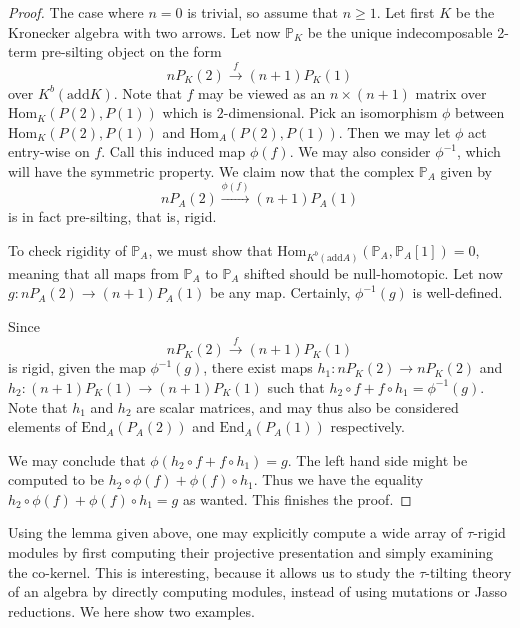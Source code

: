 \documentclass[]{article}
\theoremstyle{definition}
\newcommand{\tu}{\ensuremath{\tau}}
\begin{document}
\begin{proof}
	The case where $n = 0$ is trivial, so assume that $n \geq 1$. Let first $K$ be the Kronecker algebra with two arrows. Let now $\mathbb{P}_K $ be the unique indecomposable 2-term pre-silting object on the form \[nP_K(2) \xrightarrow{f} (n+1)P_K(1)\] over $K^b(\text{add} K)$. Note that $f$ may be viewed as an $n\times(n+1)$ matrix over $\text{Hom}_K(P(2),P(1))$ which is $2$-dimensional. Pick an isomorphism $\phi$ between $\text{Hom}_K(P(2),P(1))$ and $\text{Hom}_A(P(2),P(1))$. Then we may let $\phi$ act entry-wise on $f$. Call this induced map $\phi(f)$. We may also consider $\phi^{-1}$, which will have the symmetric property. We claim now that the complex $\mathbb{P}_A$ given by  \[nP_A(2) \xrightarrow{\phi(f)} (n+1)P_A(1)\] is in fact pre-silting, that is, rigid.
	
	To check rigidity of $\mathbb{P}_A$, we must show that $\text{Hom}_{K^b(\text{add} A)}(\mathbb{P}_A,\mathbb{P}_A[1]) = 0$, meaning that all maps from $\mathbb{P}_A$ to $\mathbb{P}_A$ shifted should be null-homotopic. Let now $g:nP_A(2) \to (n+1)P_A(1)$ be any map. Certainly, $\phi^{-1}(g)$ is well-defined.
	
	Since \[nP_K(2) \xrightarrow{f} (n+1)P_K(1)\] is rigid, given the map $\phi^{-1}(g)$, there exist maps $h_1:nP_K(2) \to nP_K(2)$ and $h_2:(n+1)P_K(1) \to (n+1)P_K(1)$ such that $h_2\circ f + f \circ h_1 = \phi^{-1}(g)$. Note that $h_1$ and $h_2$ are scalar matrices, and may thus also be considered elements of $\text{End}_A(P_A(2))$ and $\text{End}_A(P_A(1))$ respectively.
	
	We may conclude that $\phi(h_2\circ f + f \circ h_1) = g$. The left hand side might be computed to be $h_2 \circ \phi(f) + \phi(f) \circ h_1$. Thus we have the equality $h_2 \circ \phi(f) + \phi(f) \circ h_1 = g$ as wanted. This finishes the proof.
	

	
\end{proof}

Using the lemma given above, one may explicitly compute a wide array of \tu-rigid modules by first computing their projective presentation and simply examining the co-kernel. This is interesting, because it allows us to study the $\tu$-tilting theory of an algebra by directly computing modules, instead of using mutations or Jasso reductions. We here show two examples.
\end{document}
